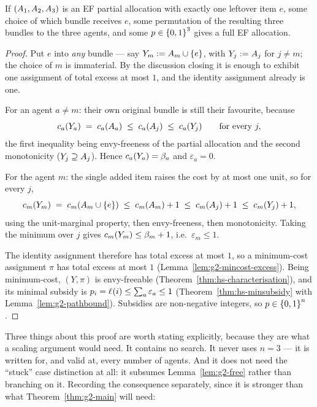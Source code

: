 \begin{theorem}
\label{thm:g2-r1}
If $(A_{1},A_{2},A_{3})$ is an EF partial allocation with exactly
one leftover item $e$, some choice of which bundle receives $e$, some
permutation of the resulting three bundles to the three agents, and some
$p \in \left\{0,1\right\}^3$ gives a full EF allocation.
\end{theorem}
\begin{proof}
Put $e$ into \emph{any} bundle --- say $Y_m := A_{m} \cup \left\{e\right\}$, with
$Y_j := A_{j}$ for $j \ne m$; the choice of $m$ is immaterial. By the
discussion closing  it is enough to exhibit one assignment
of total excess at most $1$, and the identity assignment already is one.

For an agent $a \ne m$: their own original bundle is still their favourite,
because
\[
  c_a(Y_a) \;=\; c_a(A_{a}) \;\le\; c_a(A_{j})
  \;\le\; c_a(Y_j) \qquad \text{for every } j,
\]
the first inequality being envy-freeness of the partial allocation and the
second monotonicity ($Y_j \supseteq A_{j}$). Hence $c_a(Y_a) =
\beta_a$ and $\varepsilon_a = 0$.

For the agent $m$: the single added item raises the cost by at most one
unit, so for every $j$,
\[
  c_m(Y_m) \;=\; c_m(A_{m} \cup \left\{e\right\})
  \;\le\; c_m(A_{m}) + 1
  \;\le\; c_m(A_{j}) + 1
  \;\le\; c_m(Y_j) + 1,
\]
using the unit-marginal property, then envy-freeness, then monotonicity.
Taking the minimum over $j$ gives $c_m(Y_m) \le \beta_m + 1$, i.e.\
$\varepsilon_m \le 1$.

The identity assignment therefore has total excess at most $1$, so a
minimum-cost assignment $\pi$ has total excess at most $1$
(Lemma~\ref{lem:g2-mincost-excess}). Being minimum-cost, $(Y,\pi)$ is
envy-freeable (Theorem~\ref{thm:hs-characterisation}), and its minimal subsidy is
$p_i = \ell_{}(i) \le \sum_a \varepsilon_a \le 1$
(Theorem~\ref{thm:hs-minsubsidy} with Lemma~\ref{lem:g2-pathbound}). Subsidies are
non-negative integers, so $p \in \left\{0,1\right\}^n$.
\end{proof}

Three things about this proof are worth stating explicitly, because they are
what a scaling argument would need. It contains no search. It never uses
$n = 3$ --- it is written for, and valid at, every number of agents. And it
does not need the ``stuck'' case distinction at all: it subsumes
Lemma~\ref{lem:g2-free} rather than branching on it. Recording the consequence
separately, since it is stronger than what Theorem~\ref{thm:g2-main} will need:

